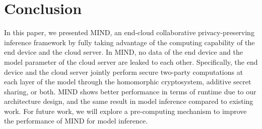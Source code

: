 \documentclass[conference]{IEEEtran}
\begin{document}
\section{Conclusion}
In this paper, we presented MIND, an end-cloud collaborative privacy-preserving inference framework by fully taking advantage of the computing capability of the end device and the cloud server. In MIND, no data of the end device and the model parameter of the cloud server are leaked to each other. Specifically, the end device and the cloud server jointly perform secure two-party computations at each layer of the model through the homomorphic cryptosystem, additive secret sharing, or both. MIND shows better performance in terms of runtime due to our architecture design, and the same result in model inference compared to existing work.
For future work, we will explore a pre-computing mechanism to improve the performance of MIND for model inference.






\end{document}
